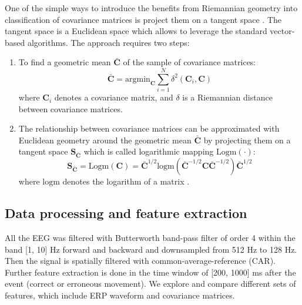 \documentclass[12pt]{iopart}
\begin{document}
One of the simple ways to introduce the benefits from Riemannian geometry
into classification of covariance matrices is project them
on a tangent space \cite{barachant_multiclass_2012}. 
The tangent space is a Euclidean space which allows
to leverage the standard vector-based algorithms.
The approach requires two steps:
\begin{enumerate}
    \item To find a geometric mean $\bar{\mathbf{C}}$ of the sample of covariance matrices:
        \begin{equation}
            \bar{\mathbf{C}} = \textrm{argmin}_\mathbf{C} \sum_{i=1}^N \delta^2 (\mathbf{C}_i, \mathbf{C})
            \label{eq:geommean}
        \end{equation}
        where $\mathbf{C}_i$ denotes a covariance matrix, and $\delta$ is a 
        Riemannian distance between covariance matrices.
    \item The relationship between covariance matrices can be approximated with
        Euclidean geometry around the geometric mean $\bar{\mathbf{C}}$ by projecting them on a tangent
        space $\mathbf{S}_{\bar{\mathbf{C}}}$ which is called logarithmic mapping $\mathrm{Logm}(\cdot)$:
        \begin{equation}
            \mathbf{S}_{\bar{\mathbf{C}}} = \mathrm{Logm}( \mathbf{C}) = \bar{\mathbf{C}}^{1/2}
            \textrm{logm}(\bar{\mathbf{C}}^{-1/2}\mathbf{C}\bar{\mathbf{C}}^{-1/2})\bar{\mathbf{C}}^{1/2}
            \label{eq:logm}
        \end{equation}
        where $\textrm{logm}$ denotes the logarithm of a matrix \cite{berger_panoramic_2003}.
\end{enumerate}

\subsection{Data processing and feature extraction}
All the EEG was filtered with Butterworth band-pass filter of order 4 within the band [1, 10] Hz
forward and backward and downsampled from 512 Hz to 128 Hz. Then the signal is spatially
filtered with common-average-reference (CAR). Further feature extraction is done
in the time window of [200, 1000] ms after the event (correct or erroneous movement).
We explore and compare different sets
of features, which include ERP waveform and covariance matrices.
\end{document}
